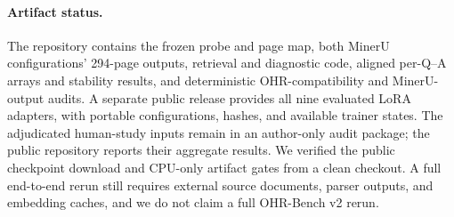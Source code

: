 \documentclass[11pt]{article}
\begin{document}
\paragraph{Artifact status.} The repository contains the frozen probe and page map, both MinerU configurations' 294-page outputs, retrieval and diagnostic code, aligned per-Q--A arrays and stability results, and deterministic OHR-compatibility and MinerU-output audits. A separate public release provides all nine evaluated LoRA adapters, with portable configurations, hashes, and available trainer states. The adjudicated human-study inputs remain in an author-only audit package; the public repository reports their aggregate results. We verified the public checkpoint download and CPU-only artifact gates from a clean checkout. A full end-to-end rerun still requires external source documents, parser outputs, and embedding caches, and we do not claim a full OHR-Bench v2 rerun.
\end{document}
